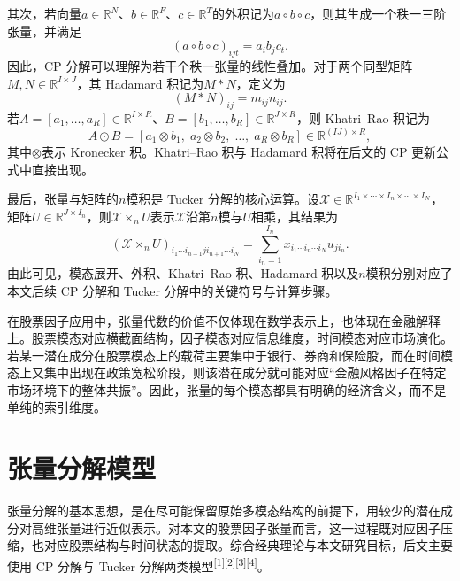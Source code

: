 其次，若向量$a\in\mathbb{R}^{N}$、$b\in\mathbb{R}^{F}$、$c\in\mathbb{R}^{T}$的外积记为$a\circ b\circ c$，则其生成一个秩一三阶张量，并满足
\begin{equation}
\left(a\circ b\circ c\right)_{ijt}=a_i b_j c_t.
\end{equation}
因此，CP 分解可以理解为若干个秩一张量的线性叠加。对于两个同型矩阵$M,N\in\mathbb{R}^{I\times J}$，其 Hadamard 积记为$M\ast N$，定义为
\begin{equation}
\left(M\ast N\right)_{ij}=m_{ij}n_{ij}.
\end{equation}
若$A=[a_1,\ldots,a_R]\in\mathbb{R}^{I\times R}$、$B=[b_1,\ldots,b_R]\in\mathbb{R}^{J\times R}$，则 Khatri--Rao 积记为
\begin{equation}
A\odot B=\left[a_1\otimes b_1,\;a_2\otimes b_2,\;\ldots,\;a_R\otimes b_R\right]\in\mathbb{R}^{(IJ)\times R},
\end{equation}
其中$\otimes$表示 Kronecker 积。Khatri--Rao 积与 Hadamard 积将在后文的 CP 更新公式中直接出现。

最后，张量与矩阵的$n$模积是 Tucker 分解的核心运算。设$\mathcal{X}\in\mathbb{R}^{I_1\times\cdots\times I_n\times\cdots\times I_N}$，矩阵$U\in\mathbb{R}^{J\times I_n}$，则$\mathcal{X}\times_n U$表示$\mathcal{X}$沿第$n$模与$U$相乘，其结果为
\begin{equation}
\left(\mathcal{X}\times_n U\right)_{i_1\cdots i_{n-1}ji_{n+1}\cdots i_N}
=\sum_{i_n=1}^{I_n}x_{i_1\cdots i_n\cdots i_N}u_{ji_n}.
\end{equation}
由此可见，模态展开、外积、Khatri--Rao 积、Hadamard 积以及$n$模积分别对应了本文后续 CP 分解和 Tucker 分解中的关键符号与计算步骤。

在股票因子应用中，张量代数的价值不仅体现在数学表示上，也体现在金融解释上。股票模态对应横截面结构，因子模态对应信息维度，时间模态对应市场演化。若某一潜在成分在股票模态上的载荷主要集中于银行、券商和保险股，而在时间模态上又集中出现在政策宽松阶段，则该潜在成分就可能对应“金融风格因子在特定市场环境下的整体共振”。因此，张量的每个模态都具有明确的经济含义，而不是单纯的索引维度。

\section{张量分解模型}

张量分解的基本思想，是在尽可能保留原始多模态结构的前提下，用较少的潜在成分对高维张量进行近似表示。对本文的股票因子张量而言，这一过程既对应因子压缩，也对应股票结构与时间状态的提取。综合经典理论与本文研究目标，后文主要使用 CP 分解与 Tucker 分解两类模型\textsuperscript{[1][2][3][4]}。

